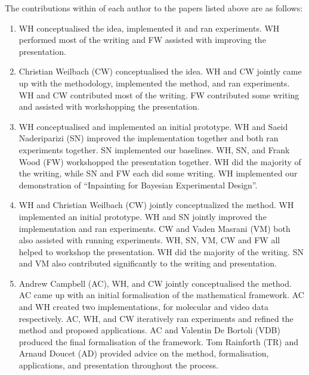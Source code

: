 The contributions within of each author to the papers listed above are as follows:
\begin{enumerate}
    \item WH conceptualised the idea, implemented it and ran experiments. WH performed most of the writing and FW assisted with improving the presentation.
    \item Christian Weilbach (CW) conceptualised the idea. WH and CW jointly came up with the methodology, implemented the method, and ran experiments. WH and CW contributed most of the writing. FW contributed some writing and assisted with workshopping the presentation.  
    \item WH conceptualised and implemented an initial prototype. WH and Saeid Naderiparizi (SN) improved the implementation together and both ran experiments together.  SN implemented our baselines. WH, SN, and Frank Wood (FW) workshopped the presentation together. WH did the majority of the writing, while SN and FW each did some writing. WH implemented our demonstration of ``Inpainting for Bayesian Experimental Design''.
    \item WH and Christian Weilbach (CW) jointly conceptualized the method. WH implemented an initial prototype. WH and SN jointly improved the implementation and ran experiments. CW and Vaden Masrani (VM) both also assisted with running experiments. WH, SN, VM, CW and FW all helped to workshop the presentation. WH did the majority of the writing. SN and VM also contributed significantly to the writing and presentation.
    \item Andrew Campbell (AC), WH, and CW jointly conceptualised the method. AC came up with an initial formalisation of the mathematical framework. AC and WH created two implementations, for molecular and video data respectively. AC, WH, and CW iteratively ran experiments and refined the method and proposed applications. AC and Valentin De Bortoli (VDB) produced the final formalisation of the framework. Tom Rainforth (TR) and Arnaud Doucet (AD) provided advice on the method, formalisation, applications, and presentation throughout the process.
\end{enumerate}